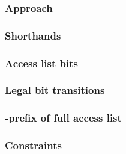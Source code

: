 \subsubsection{Approach                            } \label{rlp txn v2: phase constraints: access list: approach}              
\subsubsection{Shorthands                          } \label{rlp txn v2: phase constraints: access list: shorthands}            
\subsubsection{Access list bits                    } \label{rlp txn v2: phase constraints: access list: access list bits}      
\subsubsection{Legal bit transitions               } \label{rlp txn v2: phase constraints: access list: legal bit transitions} 
\subsubsection{\rlp{}-prefix of full access list   } \label{rlp txn v2: phase constraints: access list: access list prefix}    
\subsubsection{Constraints                         } \label{rlp txn v2: phase constraints: access list: constraints}           
